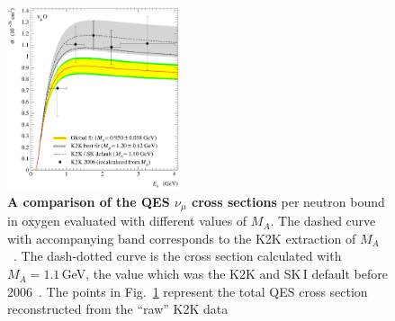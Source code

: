 \begin{figure}[htb!]
\begin{center}
\includegraphics[width=0.45\textwidth]{./QES/sQESCC_K2K06_101.3.00.301.00_2_BBBA25_SM.eps}
\caption{\label{K2K}\textbf{A comparison of the QES $\nu_{\mu}$ cross sections} per neutron bound in oxygen evaluated with different values of $M_{A}$. The dashed curve with accompanying band corresponds to the K2K extraction of $M_{A}$~\cite{Gran:2006jn}. The dash-dotted curve is the cross section calculated with $M_{A}=1.1$\,GeV, the value which was the K2K and SK\,I default before 2006~\cite{Gran:2006jn,Ashie:2005ik}. The points in Fig.~\ref{K2K} represent the total QES cross section reconstructed from the ``raw'' K2K data}
\end{center}
\end{figure}

